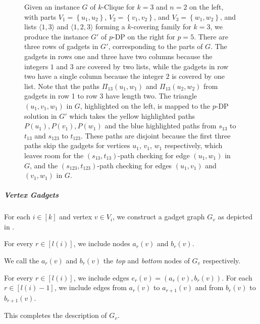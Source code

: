 \documentclass[11pt]{article}
\newcommand{\set}[1]{\left\{#1\right\}}
\theoremstyle{definition}
\begin{document}
\begin{figure}[t]
    \caption{Given an instance $G$ of \textsf{$k$-Clique} for $k=3$ and $n=2$ on the left, with parts $V_1 = \set{u_1, u_2}$, $V_2 = \set{v_1, v_2}$, and $V_3 = \set{w_1, w_2}$, and lists $\langle 1,3\rangle$ and $\langle 1,2,3\rangle$ 
    forming a $k$-covering family 
    for $k=3$, we produce the instance $G'$ of \textsf{$p$-DP} on the right for $p=5$.
    There are three rows of gadgets in $G'$, corresponding to the  parts of $G$.
    The gadgets in rows one and three have two columns because the  integers $1$ and $3$ are covered by two lists, while the gadgets in row two have 
a single column because the integer $2$ is covered by one list.
Note that the paths $\Pi_{13}(u_1,w_1)$ and $\Pi_{13}(u_2,w_2)$ from gadgets in row 1 to row 3 have length two. 
The triangle $(u_1,v_1,w_1)$ in $G$, highlighted on the left, is mapped to the \textsf{$p$-DP}  solution in $G'$ which takes the yellow highlighted paths $P(u_1), P(v_1), P(w_1)$ and the blue highlighted paths from $s_{13}$ to $t_{13}$ and $s_{123}$ to $t_{123}$.
These paths are disjoint because the first three paths skip the gadgets for vertices $u_1$, $v_1$, $w_1$ respectively, which leaves room for the $(s_{13},t_{13})$-path checking for edge $(u_1,w_1)$ in $G$, and the $(s_{123}, t_{123})$-path checking for edges $(u_1,v_1)$ and $(v_1,w_1)$ in $G$. 
} 
    \label{fig:dp-reduction}
\end{figure}

    \subparagraph{Vertex Gadgets}
    \hfill

    For each $i\in [k]$ and  vertex $v\in V_i$, we construct a gadget graph $G_{v}$ as depicted in .
    
    For every $r\in [l(i)]$, we include nodes $a_r(v)$ and $b_r(v)$.
    
    We call the $a_r(v)$ and $b_r(v)$ the \emph{top} and \emph{bottom} nodes of $G_v$ respectively.
    
    For every $r\in [l(i)]$, we include edges $e_r(v) = (a_r(v), b_r(v))$.
    For each $r\in [l(i)-1]$, we include  edges from $a_r(v)$ to $a_{r+1}(v)$ and from $b_r(v)$ to $b_{r+1}(v)$.
    
    This completes the description of $G_{v}$.
    
\end{document}
